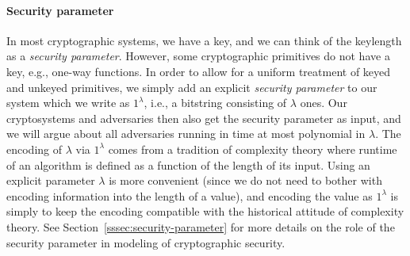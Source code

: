 \paragraph{Security parameter} In most cryptographic systems, we have a key, and we can think of the keylength as a \emph{security parameter}.
However, some cryptographic primitives do not have a key, e.g., one-way functions. In order to allow for a uniform treatment of keyed and unkeyed primitives, we simply add an explicit \emph{security parameter} to our system which we write as $1^\lambda$, i.e., a bitstring consisting of $\lambda$ ones. Our cryptosystems and adversaries then also get the security parameter as input, and we will argue about all adversaries running in time at most polynomial in $\lambda$. The encoding of $\lambda$ via $1^\lambda$ comes from a tradition of complexity theory where runtime of an algorithm is defined as a function of the length of its input. Using an explicit parameter $\lambda$ is more convenient (since we do not need to bother with encoding information into the length of a value), and encoding the value as $1^\lambda$ is simply to keep the encoding compatible with the historical attitude of complexity theory. See Section~\ref{sssec:security-parameter} for more details on the role of the security parameter in modeling of cryptographic security.